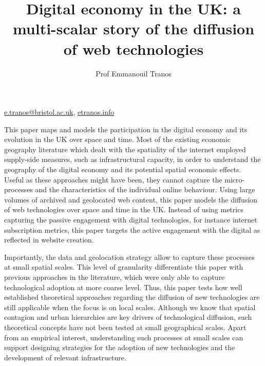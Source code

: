 \documentclass[11pt]{article}
\begin{document}
\author[1]{Prof Emmanouil Tranos}

\title{Digital economy in the UK: a multi-scalar story of the diffusion of web technologies}
\maketitle

\begin{center}
\href{mailto:e.tranos@bristol.ac.uk}{e.tranos@bristol.ac.uk},
\href{https://etranos.info/}{etranos.info}
\end{center}

\medskip

This paper maps and models the participation in the digital economy and its evolution in the UK over space and time. Most of the existing economic geography literature which dealt with the spatiality of the internet employed supply-side measures, such as infrastructural capacity, in order to understand the geography of the digital economy and its potential spatial economic effects. Useful as these approaches might have been, they cannot capture the micro-processes and the characteristics of the individual online behaviour. Using large volumes of archived and geolocated web content, this paper models the diffusion of web technologies over space and time in the UK. Instead of using metrics capturing the passive engagement with digital technologies, for instance internet subscription metrics, this paper targets the active engagement with the digital as reflected in website creation. 

Importantly, the data and geolocation strategy allow to capture these processes at small spatial scales. This level of granularity differentiate this paper with previous approaches in the literature, which were only able to capture technological adoption at more coarse level. Thus, this paper tests how well established theoretical approaches regarding the diffusion of new technologies are still applicable when the focus is on local scales. Although we know that spatial contagion and urban hierarchies are key drivers of technological diffusion, such theoretical concepts have not been tested at small geographical scales. Apart from an empirical interest, understanding such processes at small scales can support designing strategies for the adoption of new technologies and the development of relevant infrastructure. 
\end{document}
